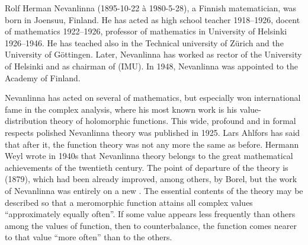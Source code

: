 \documentclass[12pt]{article}
\theoremstyle{definition}
\begin{document}
Rolf Herman Nevanlinna (1895-10-22 \`a 1980-5-28), a Finnish matematician, was born in Joensuu, Finland.  He has acted as high school teacher 1918--1926, docent of mathematics 1922--1926, professor of mathematics in University of Helsinki 1926--1946.  He has teached also in the Technical university of Z\"urich and the University of G\"ottingen.  Later, Nevanlinna has worked as rector of the University of Helsinki and as chairman of  (IMU).  In 1948, Nevanlinna was appointed to the Academy of Finland.  

Nevanlinna has acted on several  of mathematics, but especially won international fame in the complex analysis, where his most known work is his value-distribution theory of holomorphic functions.  This wide, profound and in formal respects polished Nevanlinna theory was published in 1925.  Lars Ahlfors has said that after it, the function theory was not any more the same as before.  Hermann Weyl wrote in 1940s that Nevanlinna theory belongs to the great mathematical achievements of the twentieth century.  The point of departure of the theory is  (1879), which had been already improved, among others, by Borel, but the work of Nevanlinna was entirely on a new .  The essential contents of the theory may be described so that a meromorphic function attains all complex values ``approximately equally often''.  If some value appears less frequently than others among the values of function, then to counterbalance, the function comes nearer to that value ``more often'' than to the others.
\end{document}
